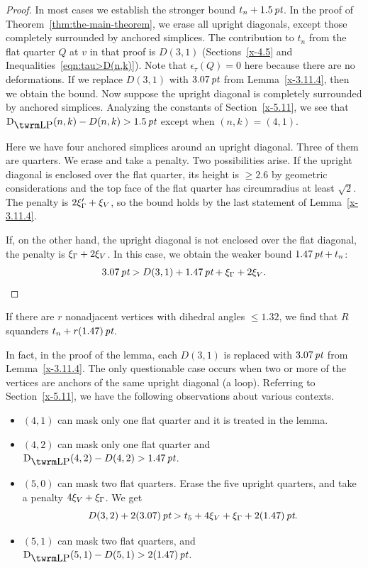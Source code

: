 \begin{proof}
In most cases we establish the stronger bound $t_n+1.5\,\hbox{\it pt}$. In the
proof of Theorem~\ref{thm:the-main-theorem}, we erase all upright
diagonals, except those completely surrounded by anchored simplices. The
contribution to $t_n$ from the flat quarter $Q$ at $v$ in that proof is
$D(3,1)$ (Sections~\ref{x-4.5} and Inequalities~\ref{eqn:tau>D(n,k)}).
Note that $\epsilon_\tau(Q)=0$ here because there are no deformations.
If we replace $D(3,1)$ with $3.07\,\hbox{\it pt}$ from Lemma~\ref{x-3.11.4}, then
we obtain the bound. Now suppose the upright diagonal is completely
surrounded by anchored simplices. Analyzing the constants of
Section~\ref{x-5.11}, we see that $\DLP(n,k)-D(n,k)>1.5\,\pt$ except
when $(n,k)=(4,1)$.

Here we have four anchored simplices around an upright diagonal. Three
of them are quarters.  We erase and take a penalty. Two possibilities
arise.  If the upright diagonal is enclosed over the flat quarter, its
height is $\ge2.6$ by geometric considerations and the top face of the
flat quarter has circumradius at least $\sqrt2$.  The penalty is
$2\xi_\Gamma'+\xi_V$, so the bound holds by the last statement of
Lemma~\ref{x-3.11.4}.

If, on the other hand, the upright diagonal is not enclosed over the
flat diagonal, the penalty is $\xi_\Gamma+2\xi_V$.  In this case, we obtain the
weaker bound $1.47\,\hbox{\it pt}+t_n$:
    $$3.07\,\hbox{\it pt} > D(3,1) + 1.47\,\hbox{\it pt} +\xi_\Gamma+2\xi_V.$$
\end{proof}

\begin{remark} \label{remark:1.47}
If there are $r$ nonadjacent vertices with dihedral angles
$\le1.32$, we find that $R$ squanders $t_n+r(1.47)\,\hbox{\it pt}$.
\end{remark}

In fact, in the proof of the lemma, each $D(3,1)$ is replaced with
$3.07\,\hbox{\it pt}$ from Lemma~\ref{x-3.11.4}.  The only questionable case
occurs when two or more of the vertices are anchors of the same upright
diagonal (a loop). Referring to Section~\ref{x-5.11}, we have the
following observations about various contexts.

\begin{itemize}
    \item $(4,1)$ can mask only one flat quarter and it is treated in the
lemma.
    \item $(4,2)$ can mask only one flat quarter and
    $\DLP(4,2)-D(4,2)>1.47\,\pt$.
    \item $(5,0)$ can mask two flat quarters.  Erase the five upright quarters,
        and take a penalty $4\xi_V+\xi_\Gamma$.  We get
    $$D(3,2)+2(3.07)\,\hbox{\it pt} > t_5+4\xi_V+\xi_\Gamma+2(1.47)\,\hbox{\it pt}.$$
    \item $(5,1)$ can mask two flat quarters, and $\DLP(5,1)-D(5,1)>2(1.47)\,\pt$.
\end{itemize}





